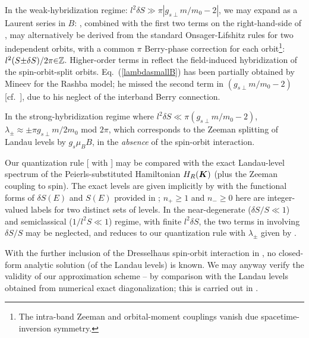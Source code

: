 \documentclass[aps, showpacs, twocolumn, notitlepage, superscriptaddress]{revtex4-1}
\begin{document}
In the weak-hybridization regime: $l^2\delta S \gg \pi|g_{s\perp} m/m_0{-}2|$, we may expand  as a Laurent series in $B$:
, combined with the first two terms on the right-hand-side of , may alternatively be derived from  the standard Onsager-Lifshitz rules for two independent orbits, with a common $\pi$ Berry-phase correction for each orbit\footnote{The intra-band Zeeman and orbital-moment couplings vanish due spacetime-inversion symmetry\cite{topoferm}.}: $l^2(S{\pm}\delta S)/2\pi {\in}\mathbb{Z}$. Higher-order terms in  reflect the field-induced hybridization of the spin-orbit-split orbits. Eq.\ (\ref{lambdasmallB}) has been partially obtained by Mineev for the Rashba model\cite{mineev_haas--van_2005}; he missed the second term in $(g_{s\perp}m/m_0-2)$ [cf.\ ], due to his neglect of the interband Berry connection.

In the strong-hybridization regime where $l^2\delta S {\ll}\pi(g_{s\perp}m/m_0{-}2)$, $\lambda_{\pm}{\approx}{\pm}\pi g_{s\perp}m/2m_0$ mod $2\pi$, which corresponds to the Zeeman splitting of Landau levels by $g_{s}\mu_BB$, in the \textit{absence} of the spin-orbit interaction. 

Our quantization rule [ with ] may be compared with the  exact Landau-level spectrum of the Peierls-substituted Hamiltonian $H_R(\boldsymbol{K})$ (plus the Zeeman coupling to spin).  The exact levels\cite{bychkov_oscillatory_1984} are given implicitly by
with the functional forms of $\delta S(E)$ and $S(E)$ provided in ;  $n_{+}{\ge} 1$ and $n_-{\ge} 0$ here are integer-valued labels for two distinct sets of levels. In the near-degenerate ($\delta S/S\ll 1$) and semiclassical ($1/l^2S \ll 1$) regime, with finite $l^2\delta S$, the two terms in  involving $\delta S/S$  may be neglected, and  reduces to our quantization rule with $\lambda_{\pm}$ given by . 


With the further inclusion of the Dresselhaus spin-orbit interaction in , no closed-form analytic solution (of the Landau levels) is known. We may anyway verify the validity of our approximation scheme  -- by comparison with the Landau levels obtained from numerical exact diagonalization; this  is carried out in  .
\end{document}
